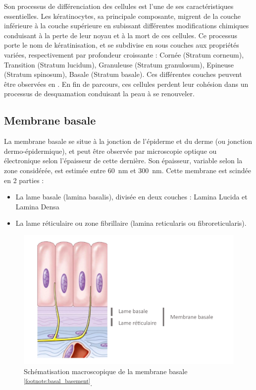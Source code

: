 \addtocounter{footnote}{1}

Son processus de différenciation des cellules est l’une de ses caractéristiques essentielles. Les kératinocytes, sa principale composante, migrent de la couche inférieure à la couche supérieure en subissant différentes modifications chimiques conduisant à la perte de leur noyau et à la mort de ces cellules. Ce processus porte le nom de kératinisation, et se subdivise en sous couches aux propriétés variées, respectivement par profondeur croissante : Cornée (Stratum corneum), Transition (Stratum lucidum), Granuleuse (Stratum granulosum), Epineuse (Stratum spinosum), Basale (Stratum basale). Ces différentes couches peuvent être observées en . En fin de parcours, ces cellules perdent leur cohésion dans un processus de desquamation conduisant la peau à se renouveler.\par\clearpage

\subsection{Membrane basale}
La membrane basale se situe à la jonction de l’épiderme et du derme (ou jonction dermo-épidermique), et peut être observée par microscopie optique ou électronique selon l’épaisseur de cette dernière. Son épaisseur, variable selon la zone considérée, est estimée entre \SI{60}{\nano\metre} et \SI{300}{\nano\metre}. 
Cette membrane est scindée en 2 parties :
\begin{itemize}
\item La lame basale (lamina basalis), divisée en deux couches : Lamina Lucida et Lamina Densa
\item La lame réticulaire ou zone fibrillaire (lamina reticularis ou fibroreticularis).
\end{itemize}\par
\begin{figure}[H]
    \centering
    \includegraphics[width=\linewidth]{contents/chapter_1/resources/basal_basement.pdf}
    \caption{Schématisation macroscopique de la membrane basale \textsuperscript{\ref{footnote:basal_basement}}.}
    \label{fig:basal_basement}
\end{figure}\par

